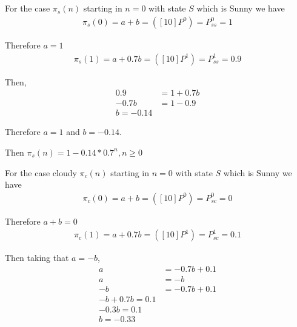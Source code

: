\documentclass[12pt, a4paper]{article}
\begin{document}
\subsection{}
For the case $\pi_s(n)$ starting in $n = 0$ with state $S$ which is Sunny we have
\begin{subequations}
  \begin{align}
    \pi_s(0) = a + b = ([1 0]P^0) = P_{ss}^0 = 1
  \end{align}
\end{subequations}

Therefore $a = 1$
\begin{subequations}
  \begin{align}
    \pi_s(1) = a + 0.7b = ([1 0]P^1) = P_{ss}^1 = 0.9
  \end{align}
\end{subequations}

Then,
\begin{subequations}
  \begin{align}
    0.9 &= 1 + 0.7b\\
    -0.7b &= 1 - 0.9\\
    b = -0.14
  \end{align}
\end{subequations}

Therefore $a = 1$ and $b = -0.14$.

Then $\pi_s(n) = 1 - 0.14 * 0.7^n, n \geq 0$

For the case cloudy $\pi_c(n)$ starting in $n = 0$ with state $S$ which is Sunny we have
\begin{subequations}
  \begin{align}
    \pi_c(0) = a + b = ([1 0]P^0) = P_{sc}^0 = 0
  \end{align}
\end{subequations}

Therefore $a + b = 0$
\begin{subequations}
  \begin{align}
    \pi_c(1) = a + 0.7b = ([1 0]P^1) = P_{sc}^1 = 0.1
  \end{align}
\end{subequations}

Then taking that $ a = -b$,
\begin{subequations}
  \begin{align}
    a &= -0.7b + 0.1\\
    a &= -b\\
    -b &= -0.7b + 0.1\\
    -b + 0.7b = 0.1\\
    -0.3 b = 0.1\\
    b = -0.33
  \end{align}
\end{subequations}
\end{document}
